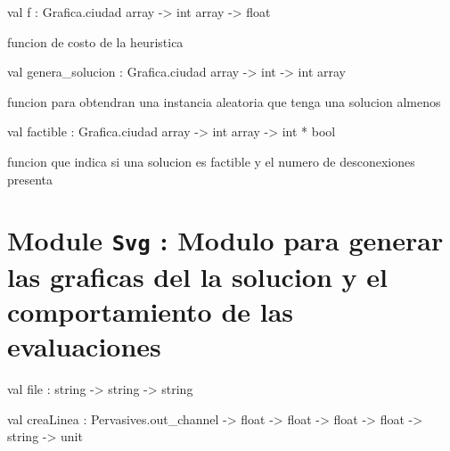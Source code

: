 \documentclass[11pt]{article}
\begin{document}
\label{val:Solucion.f}\begin{ocamldoccode}
val f : Grafica.ciudad array -> int array -> float
\end{ocamldoccode}
\begin{ocamldocdescription}
funcion de costo de la heuristica


\end{ocamldocdescription}




\label{val:Solucion.genera-underscoresolucion}\begin{ocamldoccode}
val genera_solucion : Grafica.ciudad array -> int -> int array
\end{ocamldoccode}
\begin{ocamldocdescription}
funcion para obtendran una instancia aleatoria que tenga una solucion almenos


\end{ocamldocdescription}




\label{val:Solucion.factible}\begin{ocamldoccode}
val factible : Grafica.ciudad array -> int array -> int * bool
\end{ocamldoccode}
\begin{ocamldocdescription}
funcion que indica si una solucion es factible y el numero de desconexiones 
presenta


\end{ocamldocdescription}


\section{Module {\tt{Svg}} : Modulo para generar las graficas del la solucion y el comportamiento de las evaluaciones}
\label{module:Svg}




\ocamldocvspace{0.5cm}



\label{val:Svg.file}\begin{ocamldoccode}
val file : string -> string -> string
\end{ocamldoccode}




\label{val:Svg.creaLinea}\begin{ocamldoccode}
val creaLinea :
  Pervasives.out_channel -> float -> float -> float -> float -> string -> unit
\end{ocamldoccode}
\end{document}
